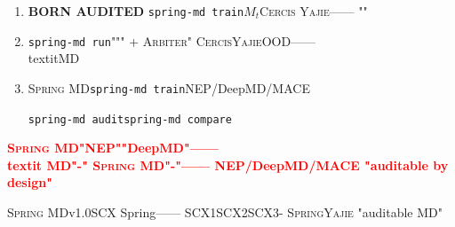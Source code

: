 \documentclass[12pt,a4paper]{article}
\theoremstyle{remark}
\newcommand{\Spring}{\textsc{Spring}}
\newcommand{\Yajie}{\textsc{Yajie}}
\newcommand{\Cercis}{\textsc{Cercis}}
\newcommand{\Arbiter}{\textsc{Arbiter}}
\newcommand{\SpringMD}{\textsc{Spring MD}}
\newcommand{\honestcrit}[1]{%
    \textcolor{red}{\textbf{#1}}%
}
\begin{document}
\begin{enumerate}[label=(\arabic*),itemsep=5pt]
    \item \textbf{BORN AUDITED}
    \texttt{spring-md train}$M_t$\Cercis{}
    \Yajie{}——
    ""

    \item \textbf{}
    \texttt{spring-md run}""" + \Arbiter{}"
    \Cercis{}\Yajie{}OOD——
    \\textit{}MD

    \item \textbf{}
    \SpringMD{}\texttt{spring-md train}NEP/DeepMD/MACE
    
    \texttt{spring-md audit}\texttt{spring-md compare}
    

\end{enumerate}

\honestcrit{\SpringMD{}"NEP""DeepMD"——\\textit{}
MD"-"
\SpringMD{}"-"——
NEP/DeepMD/MACE
"auditable by design"}

\SpringMD{}v1.0SCX Spring——
SCX1SCX2SCX3-
\Spring{}\Yajie{}
"auditable MD"
\end{document}
